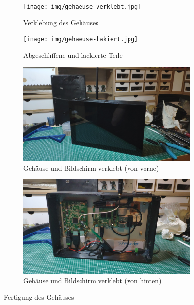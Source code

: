 \begin{figure}[h!tb]
	\begin{subfigure}[b]{0.5\linewidth}
		\centering
		\texttt{[image: img/gehaeuse-verklebt.jpg]}
		\caption[Verklebung des Gehäusess]{Verklebung des Gehäuses}
		\label{fig:glued_parts}
	\end{subfigure}
	\begin{subfigure}[b]{0.5\linewidth}
		\centering
		\texttt{[image: img/gehaeuse-lakiert.jpg]}
		\caption[Abgeschliffene und lackierte Teile]{Abgeschliffene und lackierte Teile}
		\label{fig:filed_and_painted_parts}
	\end{subfigure}
	\begin{subfigure}[b]{0.5\linewidth}
		\centering
		\includegraphics[width=1\textwidth]{img/geraet_front.jpg}
		\caption[Gehäuse und Bildschirm verklebt (von vorne)]{Gehäuse und Bildschirm verklebt (von vorne)}
		\label{fig:finished_case_front}
	\end{subfigure}
	\begin{subfigure}[b]{0.5\linewidth}
		\centering
		\includegraphics[width=1\textwidth]{img/geraet_rueck.jpg}
		\caption[Gehäuse und Bildschirm verklebt (von hinten)]{Gehäuse und Bildschirm verklebt (von hinten)}
		\label{fig:finished_case_back}
	\end{subfigure}
	\caption[Fertigung des Gehäuses]{Fertigung des Gehäuses}
	\label{fig:creating-case}
\end{figure}\par
